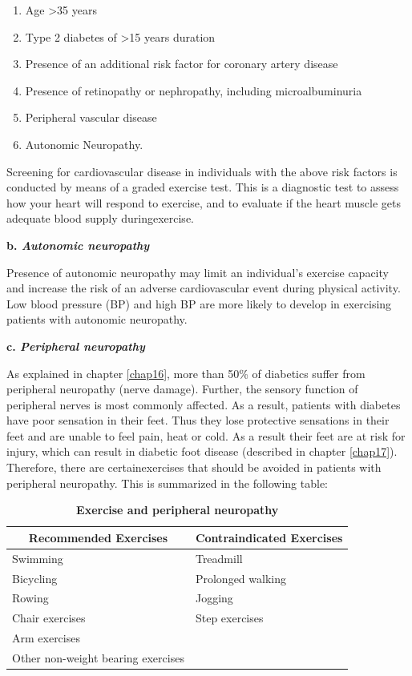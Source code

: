 \begin{enumerate}[•]
\itemsep=0pt
\item Age \textgreater  35 years
\item Type 2 diabetes of \textgreater  15 years duration
\item Presence of an additional risk factor for coronary artery disease
\item Presence of retinopathy or nephropathy, including microalbuminuria
\item Peripheral vascular disease
\item Autonomic Neuropathy.
\end{enumerate}

Screening for cardiovascular disease in individuals with the above risk factors is conducted by means of a graded exercise test. This is a dia\-gnostic test to assess how your heart will respond to exercise, and to evaluate if the heart muscle gets adequate blood supply during\break exercise.

\noindent\textbf{b. \textit{Autonomic neuropathy}}

Presence of autonomic neuropathy may limit an individual’s exercise capacity and increase the risk of an adverse cardiovascular event during physical activity. Low blood pressure (BP) and high BP are more likely to develop in exercising patients with autonomic neuropathy.

\noindent\textbf{c. \textit{Peripheral neuropathy}}

As explained in chapter \ref{chap16}, more than 50\% of diabetics suffer from peripheral neuropathy (nerve damage). Further, the sensory function of peripheral nerves is most commonly affected. As a result, patients with diabetes have poor sensation in their feet. Thus they lose prote\-ctive sensations in their feet and are unable to feel pain, heat or cold. As a result their feet are at risk for injury, which can result in diabetic foot disease (described in chapter \ref{chap17}). Therefore, there are certain\break exercises that should be avoided in patients with peripheral neuro\-pathy. This is summarized in the following table:

{
\begin{table}[H]
\centering
\caption*{\textbf{Exercise and peripheral neuropathy}}
\small\addtolength{\tabcolsep}{-3pt}
\begin{tabular}{|l|l|}
\hline
\multicolumn{1}{|c|}{\textbf{Recommended Exercises}} & \multicolumn{1}{|c|}{\textbf{Contraindicated Exercises}}\\
\hline
Swimming & Treadmill\\
\hline
Bicycling & Prolonged walking\\
\hline
Rowing & Jogging\\
\hline
Chair exercises & Step exercises\\
\hline
Arm exercises & \multirow{2}{1.5cm}{}\\
\cline{1-1}
Other non-weight bearing exercises & \\
\hline
\end{tabular}
\end{table}
}\relax

